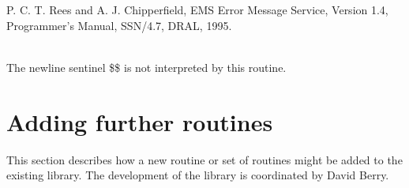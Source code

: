 \documentclass[11pt,twoside]{article}
\newcommand{\xlabel}[1]{}
\newcommand{\sstimplementationstatus}[1]{
   \item[{Implementation Status:}] \mbox{} \\[1.3ex] #1}
\newcommand{\sstimplementationstatus}[1]{
      \item[Implementation Status:] #1
   }
\begin{document}
{{         P. C. T. Rees and A. J. Chipperfield, EMS Error Message Service,
            Version 1.4, Programmer's Manual,
            SSN/4.7, DRAL, 1995.
   }
   \sstimplementationstatus{
      The newline sentinel \$\$ is not interpreted by this routine.
   }
}


\section{\xlabel{adding_further_routines}Adding further routines}

   This section describes how a new routine or set of routines might be
   added to the existing library.
   The development of the library is coordinated by David Berry.
\end{document}
